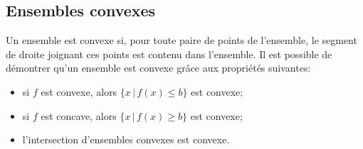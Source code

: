 \subsection{Ensembles convexes}

Un ensemble est convexe si, pour toute paire de points de l'ensemble, le segment de droite joignant ces points est contenu dans l'ensemble.
Il est possible de démontrer qu'un ensemble est convexe grâce aux propriétés suivantes:
\begin{itemize}
	\item
	si $f$ est convexe, alors $\lbrace x \,|\, f(x) \leq b \rbrace$ est convexe;
	\item
	si $f$ est concave, alors $\lbrace x \,|\, f(x) \geq b \rbrace$ est convexe;
	\item
	l'intersection d'ensembles convexes est convexe.
\end{itemize}

